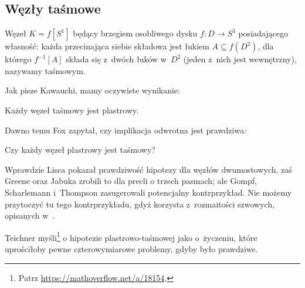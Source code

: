 
\subsection{Węzły taśmowe}
%

\begin{definition}
    Węzeł $K = f[S^1]$ będący brzegiem osobliwego dysku $f \colon D \to S^3$ posiadającego  własność: każda przecinająca siebie składowa jest łukiem $A \subseteq f(D^2)$, dla którego $f^{-1}[A]$ składa się z~dwóch łuków w~$D^2$ (jeden z~nich jest wewnętrzny), nazywamy taśmowym.
\end{definition}

Jak pisze Kawauchi, mamy oczywiste wynikanie:

\begin{proposition}
%
    Każdy węzeł taśmowy jest plastrowy.
\end{proposition}

Dawno temu Fox \cite[problem 1.33]{kirby1978} zapytał, czy implikacja odwrotna jest prawdziwa:
%

\begin{conjecture}
    Czy każdy węzeł plastrowy jest taśmowy?
\end{conjecture}

Wprawdzie Lisca \cite{lisca2007} pokazał prawdziwość hipotezy dla węzłów dwumostowych,
%
%
zaś Greene oraz Jabuka \cite{greene2011} zrobili to dla precli o trzech pasmach;
%
%
%
ale Gompf, Scharlemann i~Thompson \cite{gompf2010} zasugerowali potencjalny kontrprzykład.
%
%
%
%
Nie możemy przytoczyć tu tego kontrprzykładu, gdyż korzysta z~rozmaitości szwowych, opisanych w~\cite[s. 53-59]{kawauchi1996}.

Teichner myśli\footnote{Patrz \url{https://mathoverflow.net/a/18154}.} o hipotezie plastrowo-taśmowej jako o~życzeniu, które uprościłoby pewne czterowymiarowe problemy, gdyby było prawdziwe.
%



